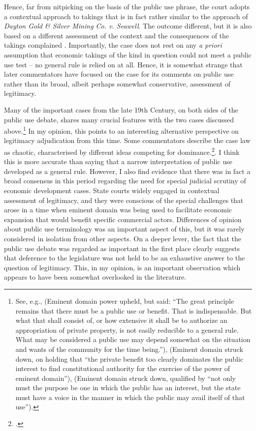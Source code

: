Hence, far from nitpicking on the basis of the public use phrase, the court adopts a contextual approach to takings that is in fact rather similar to the approach of {\it Dayton Gold \& Silver Mining Co. v. Seawell}. The outcome  different, but it is also based on a different assessment of the context and the consequences of the takings complained . Importantly, the case does not rest on any {\it a priori} assumption that economic takings of the kind in question could not meet a public use test -- no general rule is relied on at all. Hence, it is somewhat strange that later commentators have focused on the case for its comments on public use rather than its broad, albeit perhaps somewhat conservative, assessment of legitimacy. 

Many of the important cases from the late 19th Century, on both sides of the public use debate, shares many crucial features with the two cases discussed above.\footnote{See, e.g., \cite{scudder32} (Eminent domain power upheld, but said: ``The great principle remains that there must be a public use or benefit. That is indispensable. But what that shall consist of, or how extensive it shall be to authorize an appropriation of private property, is not easily reducible to a general rule. What may be considered a public use may depend somewhat on the situation and wants of the community for the time being.''), \cite{fallsburg03} (Eminent domain struck down, on holding that ``the private benefit too clearly dominates the public interest to find constitutional authority for the exercise of the power of eminent domain''), \cite[538]{board91} (Eminent domain struck down, qualified by ``not only must the purpose be one in which the public has an interest, but the state must have a voice in the manner in which the public may avail itself of that use'').} In my opinion, this points to an interesting alternative perspective on legitimacy adjudication from this time. Some commentators describe the case law as chaotic, characterised by different ideas competing for dominance.\footcite{berger78,meidinger80}. I think this is more accurate than saying that a narrow interpretation of public use developed as a general rule. However, I also find evidence that there was in fact a broad consensus in this period regarding the need for special judicial scrutiny of economic development cases. State courts widely engaged in contextual assessment of legitimacy, and they were conscious of the special challenges that arose in a time when eminent domain was being used to facilitate economic expansion that would benefit specific commercial actors. Differences of opinion about public use terminology was an important aspect of this, but it was rarely considered in isolation from other aspects. On a deeper lever, the fact that the public use debate was regarded as important in the first place clearly suggests that deference to the legislature was not held to be an exhaustive answer to the question of legitimacy. This, in my opinion, is an important observation which appears to have been somewhat overlooked in the literature. 

